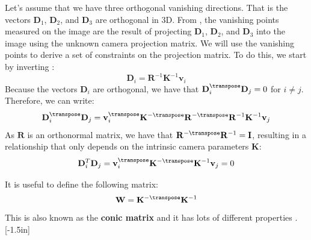 Let's assume that we have three orthogonal vanishing directions. That is the vectors $\mathbf{D}_1$, $\mathbf{D}_2$, and $\mathbf{D}_3$ are orthogonal in 3D. From \eqn{\ref{eq:vanishing_projection}}, the vanishing points measured on the image are the result of projecting $\mathbf{D}_1$, $\mathbf{D}_2$, and $\mathbf{D}_3$ into the image using the unknown camera projection matrix. We will use the vanishing points to derive a set of constraints on the projection matrix. To do this, we start by inverting \eqn{\ref{eq:vanishing_projection}}:
\begin{equation}
\mathbf{D}_i = \mathbf{R}^{-1} \mathbf{K}^{-1} \mathbf{v}_i
\label{eq:vanishing_projection_inv}
\end{equation}
Because the vectors $\mathbf{D}_i$ are orthogonal, we have that $\mathbf{D}_i^{\transpose} \mathbf{D}_j = 0$ for $i \neq j$. Therefore, we can write:
\begin{equation}
\mathbf{D}_i^\transpose \mathbf{D}_j = \mathbf{v}_i^\transpose \mathbf{K}^{-\transpose} \mathbf{R}^{-\transpose} \mathbf{R}^{-1} \mathbf{K}^{-1} \mathbf{v}_j 
\label{eq:vanishing_projection_constraint}
\end{equation}
As $\mathbf{R}$ is an orthonormal matrix, we have that $\mathbf{R}^{-\transpose} \mathbf{R}^{-1} = \mathbf{I}$, resulting in a relationship that only depends on the intrinsic camera parameters $\mathbf{K}$:
\begin{equation}
\mathbf{D}_i^T \mathbf{D}_j = \mathbf{v}_i^\transpose \mathbf{K}^{-\transpose} \mathbf{K}^{-1} \mathbf{v}_j = 0
\label{eq:vanishing_projection_constraint}
\end{equation}


It is useful to define the following matrix:
\begin{equation}
\mathbf{W} =  \mathbf{K}^{-\transpose} \mathbf{K}^{-1}
\end{equation}
This is also known as the {\bf conic matrix}
and it has lots of different properties \cite{Hartley2004}. 
[-1.5in]

